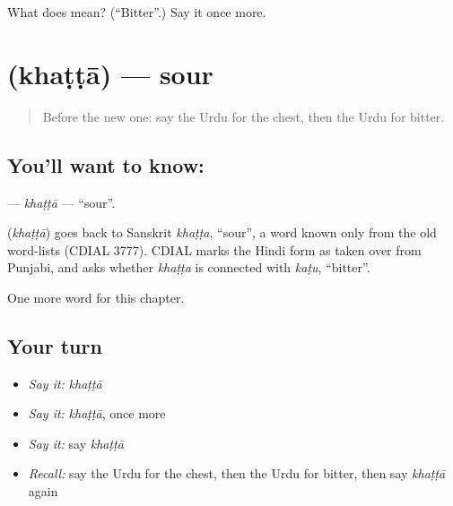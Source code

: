 \begin{tcolorbox}[breakable,colback=teal!4,colframe=teal!35!black,title={Before you move on}]
What does  mean? (\textquotedblleft{}Bitter\textquotedblright{}.) Say it once more.
\end{tcolorbox}
\section[\texorpdfstring{\ur{کھٹا} (khaṭṭā)}{کھٹا (khaṭṭā)}]{ (khaṭṭā) — sour}

\label{lesson:UR-C131-khatta}



\begin{quote}
Before the new one: say the Urdu for the chest, then the Urdu for bitter.
\end{quote}

\subsection*{You'll want to know: }
\textbf{} — \emph{khaṭṭā} — \textquotedblleft{}sour\textquotedblright{}.

\begin{cousinweb}
\textbf{} (\emph{khaṭṭā}) goes back to Sanskrit \emph{khaṭṭa}, \textquotedblleft{}sour\textquotedblright{}, a word known only from the old word-lists (CDIAL 3777). CDIAL marks the Hindi form as taken over from Punjabi, and asks whether \emph{khaṭṭa} is connected with \emph{kaṭu}, \textquotedblleft{}bitter\textquotedblright{}.
\end{cousinweb}

\begin{grammarlens}[title={What you've built}]
One more word for this chapter.
\end{grammarlens}

\subsection*{Your turn}
\begin{itemize}
\raggedright
  \item \emph{Say it:} \emph{khaṭṭā}
  \item \emph{Say it:} \emph{khaṭṭā}, once more
  \item \emph{Say it:} say \emph{khaṭṭā}
  \item \emph{Recall:} say the Urdu for the chest, then the Urdu for bitter, then say \emph{khaṭṭā} again
\end{itemize}

